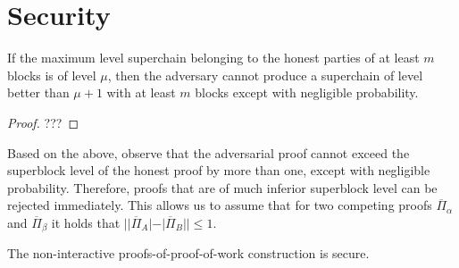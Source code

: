 \section{Security}

\begin{lemma}
    If the maximum level superchain belonging to the honest parties of at least
    $m$ blocks is of level $\mu$, then the adversary cannot produce a
    superchain of level better than $\mu + 1$ with at least $m$ blocks except
    with negligible probability.
\end{lemma}
\begin{proof}
    ???
\end{proof}

Based on the above, observe that the adversarial proof cannot exceed the
superblock level of the honest proof by more than one, except with negligible
probability. Therefore, proofs that are of much inferior superblock level can
be rejected immediately. This allows us to assume that for two competing proofs
$\overline{\Pi}_\alpha$ and $\overline{\Pi}_\beta$ it holds that
$||\overline{\Pi}_A| - |\overline{\Pi}_B|| \leq 1$.

\begin{theorem}
    The non-interactive proofs-of-proof-of-work construction is secure.
\end{theorem}

